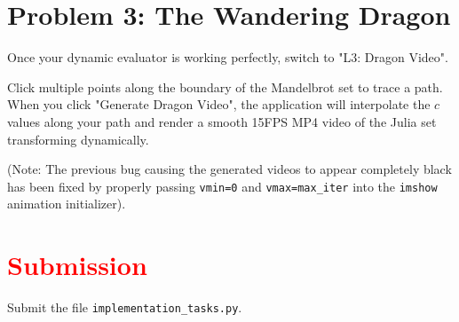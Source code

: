 \documentclass[11pt]{article}
\begin{document}
\section*{Problem 3: The Wandering Dragon}

Once your dynamic evaluator is working perfectly, switch to "L3: Dragon Video". 

Click multiple points along the boundary of the Mandelbrot set to trace a path. When you click "Generate Dragon Video", the application will interpolate the $c$ values along your path and render a smooth 15FPS MP4 video of the Julia set transforming dynamically. 

(Note: The previous bug causing the generated videos to appear completely black has been fixed by properly passing \lstinline|vmin=0| and \lstinline|vmax=max_iter| into the \lstinline|imshow| animation initializer).

\section*{\textcolor{red}{Submission}}
Submit the file \texttt{implementation\_tasks.py}.
\end{document}
